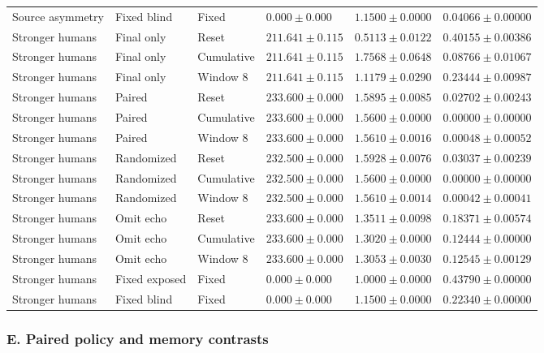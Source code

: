 \begin{longtable}{@{}llllll@{}}
Source asymmetry & Fixed blind & Fixed & $0.000 \pm 0.000$ & $1.1500 \pm 0.0000$ & $0.04066 \pm 0.00000$ \\
Stronger humans & Final only & Reset & $211.641 \pm 0.115$ & $0.5113 \pm 0.0122$ & $0.40155 \pm 0.00386$ \\
Stronger humans & Final only & Cumulative & $211.641 \pm 0.115$ & $1.7568 \pm 0.0648$ & $0.08766 \pm 0.01067$ \\
Stronger humans & Final only & Window 8 & $211.641 \pm 0.115$ & $1.1179 \pm 0.0290$ & $0.23444 \pm 0.00987$ \\
Stronger humans & Paired & Reset & $233.600 \pm 0.000$ & $1.5895 \pm 0.0085$ & $0.02702 \pm 0.00243$ \\
Stronger humans & Paired & Cumulative & $233.600 \pm 0.000$ & $1.5600 \pm 0.0000$ & $0.00000 \pm 0.00000$ \\
Stronger humans & Paired & Window 8 & $233.600 \pm 0.000$ & $1.5610 \pm 0.0016$ & $0.00048 \pm 0.00052$ \\
Stronger humans & Randomized & Reset & $232.500 \pm 0.000$ & $1.5928 \pm 0.0076$ & $0.03037 \pm 0.00239$ \\
Stronger humans & Randomized & Cumulative & $232.500 \pm 0.000$ & $1.5600 \pm 0.0000$ & $0.00000 \pm 0.00000$ \\
Stronger humans & Randomized & Window 8 & $232.500 \pm 0.000$ & $1.5610 \pm 0.0014$ & $0.00042 \pm 0.00041$ \\
Stronger humans & Omit echo & Reset & $233.600 \pm 0.000$ & $1.3511 \pm 0.0098$ & $0.18371 \pm 0.00574$ \\
Stronger humans & Omit echo & Cumulative & $233.600 \pm 0.000$ & $1.3020 \pm 0.0000$ & $0.12444 \pm 0.00000$ \\
Stronger humans & Omit echo & Window 8 & $233.600 \pm 0.000$ & $1.3053 \pm 0.0030$ & $0.12545 \pm 0.00129$ \\
Stronger humans & Fixed exposed & Fixed & $0.000 \pm 0.000$ & $1.0000 \pm 0.0000$ & $0.43790 \pm 0.00000$ \\
Stronger humans & Fixed blind & Fixed & $0.000 \pm 0.000$ & $1.1500 \pm 0.0000$ & $0.22340 \pm 0.00000$ \\
\end{longtable}\endgroup
\clearpage
\subsubsection*{E. Paired policy and memory contrasts}
\begingroup\footnotesize\setlength{\tabcolsep}{4pt}

